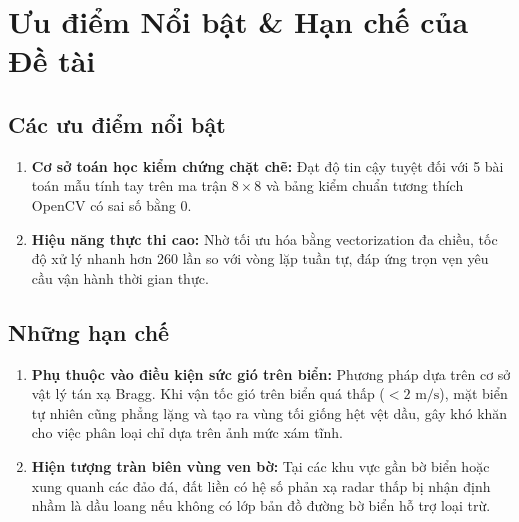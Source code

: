 \section{Ưu điểm Nổi bật \& Hạn chế của Đề tài}

\subsection{Các ưu điểm nổi bật}
\begin{enumerate}
    \item \textbf{Cơ sở toán học kiểm chứng chặt chẽ:} Đạt độ tin cậy tuyệt đối với 5 bài toán mẫu tính tay trên ma trận $8 \times 8$ và bảng kiểm chuẩn tương thích OpenCV có sai số bằng 0.
    \item \textbf{Hiệu năng thực thi cao:} Nhờ tối ưu hóa bằng vectorization đa chiều, tốc độ xử lý nhanh hơn 260 lần so với vòng lặp tuần tự, đáp ứng trọn vẹn yêu cầu vận hành thời gian thực.
\end{enumerate}

\subsection{Những hạn chế}
\begin{enumerate}
    \item \textbf{Phụ thuộc vào điều kiện sức gió trên biển:} Phương pháp dựa trên cơ sở vật lý tán xạ Bragg. Khi vận tốc gió trên biển quá thấp ($< 2\text{ m/s}$), mặt biển tự nhiên cũng phẳng lặng và tạo ra vùng tối giống hệt vệt dầu, gây khó khăn cho việc phân loại chỉ dựa trên ảnh mức xám tĩnh.
    \item \textbf{Hiện tượng tràn biên vùng ven bờ:} Tại các khu vực gần bờ biển hoặc xung quanh các đảo đá, đất liền có hệ số phản xạ radar thấp bị nhận định nhầm là dầu loang nếu không có lớp bản đồ đường bờ biển hỗ trợ loại trừ.
\end{enumerate}



